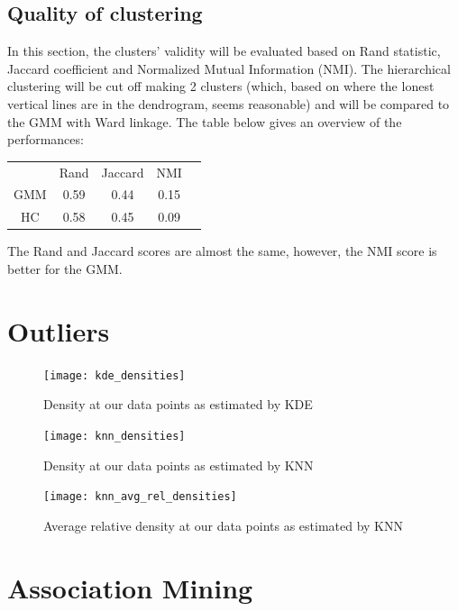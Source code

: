 \subsection{Quality of clustering}
In this section, the clusters' validity will be evaluated based on Rand statistic,
Jaccard coefficient and Normalized Mutual Information (NMI). The hierarchical clustering
will be cut off making 2 clusters (which, based on where the lonest vertical lines
are in the dendrogram, seems reasonable) and will be compared to the GMM with
Ward linkage. The table below gives an overview of the performances:\\
\begin{table}[h]
\centering
\begin{tabular}{ccccc}
    & Rand & Jaccard & NMI\\
GMM & 0.59 & 0.44 & 0.15 \\
HC & 0.58 & 0.45 & 0.09 \\
\end{tabular}
\end{table}

The Rand and Jaccard scores are almost the same, however, the NMI score is better
for the GMM.

\section{Outliers}
\begin{figure}[htb]
  \centering
  \texttt{[image: kde\_densities]}
  \caption{Density at our data points as estimated by KDE}
\end{figure}

\begin{figure}[htb]
  \centering
  \texttt{[image: knn\_densities]}
  \caption{Density at our data points as estimated by KNN}
\end{figure}

\begin{figure}[htb]
  \centering
  \texttt{[image: knn\_avg\_rel\_densities]}
  \caption{Average relative density at our data points as estimated by KNN}
\end{figure}

\section{Association Mining}

